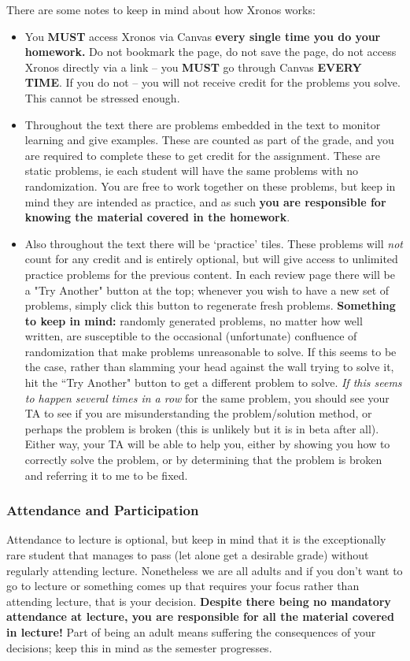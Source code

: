 \documentclass{ximeraXloud}
\begin{document}
    There are some notes to keep in mind about how Xronos works:
    \begin{itemize}
    	\item You \textbf{MUST} access Xronos via Canvas \textbf{every single time you do your homework.} Do not bookmark the page, do not save the page, do not access Xronos directly via a link -- you \textbf{MUST} go through Canvas \textbf{EVERY TIME}. If you do not -- you will not receive credit for the problems you solve. This cannot be stressed enough.
    	    
    	\item Throughout the text there are problems embedded in the text to monitor learning and give examples. These are counted as part of the grade, and you are required to complete these to get credit for the assignment. These are static problems, ie each student will have the same problems with no randomization. You are free to work together on these problems, but keep in mind they are intended as practice, and as such \textbf{you are responsible for knowing the material covered in the homework}. 
    	
    	\item Also throughout the text there will be `practice' tiles. These problems will \textit{not} count for any credit and is entirely optional, but will give access to unlimited practice problems for the previous content. In each review page there will be a "Try Another" button at the top; whenever you wish to have a new set of problems, simply click this button to regenerate fresh problems. \textbf{Something to keep in mind:} randomly generated problems, no matter how well written, are susceptible to the occasional (unfortunate) confluence of randomization that make problems unreasonable to solve. If this seems to be the case, rather than slamming your head against the wall trying to solve it, hit the ``Try Another" button to get a different problem to solve. \textit{If this seems to happen several times in a row} for the same problem, you should see your TA to see if you are misunderstanding the problem/solution method, or perhaps the problem is broken (this is unlikely but it is in beta after all). Either way, your TA will be able to help you, either by showing you how to correctly solve the problem, or by determining that the problem is broken and referring it to me to be fixed.
    \end{itemize}


\subsubsection*{Attendance and Participation}
    Attendance to lecture is optional, but keep in mind that it is the exceptionally rare student that manages to pass (let alone get a desirable grade) without regularly attending lecture. Nonetheless we are all adults and if you don't want to go to lecture or something comes up that requires your focus rather than attending lecture, that is your decision. \textbf{Despite there being no mandatory attendance at lecture, you are responsible for all the material covered in lecture!} Part of being an adult means suffering the consequences of your decisions; keep this in mind as the semester progresses.
    
\end{document}
